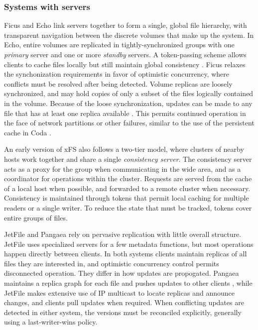 \subsubsection{Systems with servers}

Ficus \cite{guy} and Echo \cite{birrell93} link servers together to form a single, global file hierarchy, with transparent navigation between the discrete volumes that make up the system. In Echo, entire volumes are replicated in tightly-synchronized groups with one \emph{primary} server and one or more \emph{standby} servers. A token-passing scheme allows clients to cache files locally but still maintain global consistency \cite{mann}. Ficus relaxes the synchonization requirements in favor of optimistic concurrency, where conflicts must be resolved after being detected. Volume replicas are loosely synchronized, and may hold copies of only a subset of the files logically contained in the volume. Because of the loose synchronization, updates can be made to any file that has at least one replica available \cite{popek}. This permits continued operation in the face of network partitions or other failures, similar to the use of the persistent cache in Coda \cite{kistler}.

An early version of xFS \cite{wang93} also follows a two-tier model, where clusters of nearby hosts work together and share a single \emph{consistency server}. The consistency server acts as a proxy for the group when communicating in the wide area, and as a coordinator for operations within the cluster. Requests are served from the cache of a local host when possible, and forwarded to a remote cluster when necessary. Consistency is maintained through tokens that permit local caching for multiple readers or a single writer. To reduce the state that must be tracked, tokens cover entire groups of files.

JetFile \cite{gronvall} and Pangaea \cite{saito02a} rely on pervasive replication with little overall structure. JetFile  uses specialized servers for a few metadata functions, but most operations happen directly between clients. In both systems clients maintain replicas of all files they are interested in, and optimistic concurrency control permits disconnected operation. They differ in how updates are propogated. Pangaea maintains a replica graph for each file and pushes updates to other clients \cite{saito02b}, while JetFile makes extensive use of IP multicast to locate replicas and announce changes, and clients pull updates when required. When conflicting updates are detected in either system, the versions must be reconciled explicitly, generally using a last-writer-wins policy.


